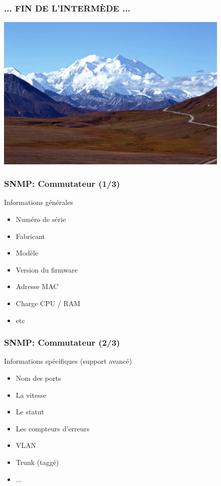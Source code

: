 \documentclass{beamer}
\begin{document}
\begin{frame}
    \frametitle{... FIN DE L'INTERM\`{E}DE ...}

    \includegraphics[height=7.5cm]{./pics/montagne.jpg}

\end{frame}



\begin{frame}
    \frametitle{SNMP: Commutateur (1/3)}

    \begin{block}{Informations générales}
    \begin{itemize}
    \item Numéro de série
    \item Fabricant
    \item Modèle
    \item Version du firmware
    \item Adresse MAC
    \item Charge CPU / RAM
    \item etc
    \end{itemize}
    \end{block}
\end{frame}

\begin{frame}
    \frametitle{SNMP: Commutateur (2/3)}

    \begin{block}{Informations spécifiques (support avancé)}
    \begin{itemize}
    \item Nom des ports 
    \item La vitesse
    \item Le statut
    \item Les compteurs d'erreurs
    \item VLAN
    \item Trunk (taggé)
    \item ...
    \end{itemize}
    \end{block}
\end{frame}
\end{document}
